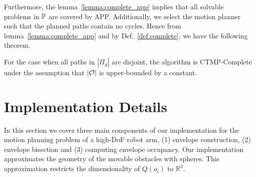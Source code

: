 \documentclass[a4paper]{report}
\begin{document}
Furthermore, the lemma~\ref{lemma:complete_app} implies that all solvable problems in $\mathbb{P}$ are covered by APP.
Additionally, we select the motion planner \calP such that the planned paths contain no cycles.
Hence from lemma~\ref{lemma:complete_app} and by Def.~\ref{def:complete}, we have the following theorem.

\vspace{2mm}
\begin{theorem}
	For the case when all paths in $|\Pi_g|$ are disjoint, the algorithm is CTMP-Complete under the assumption that $|\mathcal{O}|$ is upper-bounded by a constant.
\end{theorem}

%

\section{Implementation Details} %
In this section we cover three main components of our implementation for the motion planning problem of a high-DoF robot arm, (1) envelope construction, (2) envelope bisection and (3) computing envelope occupancy.
%
Our implementation approximates the geometry of the movable obstacles with spheres. This approximation restricts the dimensionality of $Q(o_i)$ to $\mathbb{R}^3$.
\end{document}
